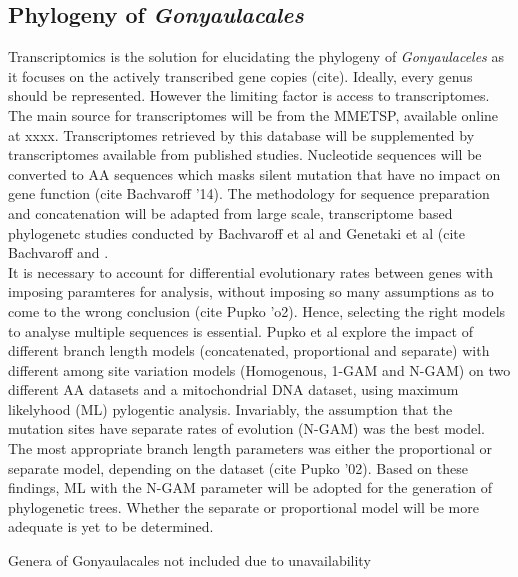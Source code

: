 \documentclass[12pt]{article}
\begin{document}
\subsection{Phylogeny of \emph{Gonyaulacales}}
Transcriptomics is the solution for elucidating the phylogeny of \emph{Gonyaulaceles} as it focuses on the actively transcribed gene copies (cite). Ideally, every genus should be represented. However the limiting factor is access to transcriptomes. The main source for transcriptomes will be from the MMETSP, available online at xxxx. Transcriptomes retrieved by this database will be supplemented by transcriptomes available from published studies. Nucleotide sequences will be converted to AA sequences which masks silent mutation that have no impact on gene function (cite Bachvaroff '14). The methodology for sequence preparation and concatenation will be adapted from large scale, transcriptome based phylogenetc studies conducted by Bachvaroff et al and Genetaki et al (cite Bachvaroff and \cite{gentekaki2014large}.\\
It is necessary to account for differential evolutionary rates between genes with imposing paramteres for analysis, without imposing so many assumptions as to come to the wrong conclusion (cite Pupko 'o2). Hence, selecting the right models to analyse multiple sequences is essential. Pupko et al explore the impact of different branch length models (concatenated, proportional and separate) with different among site variation models (Homogenous, 1-GAM and N-GAM) on two different AA datasets and a mitochondrial DNA dataset, using maximum likelyhood (ML) pylogentic analysis. Invariably, the assumption that the mutation sites have separate rates of evolution (N-GAM) was the best model. The most appropriate branch length parameters was either the proportional or separate model, depending on the dataset (cite Pupko '02). Based on these findings, ML with the N-GAM parameter will be adopted for the generation of phylogenetic trees. Whether the separate or proportional model will be more adequate is yet to be determined.

Genera of Gonyaulacales not included due to unavailability
\end{document}
